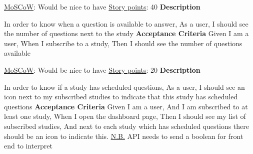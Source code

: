 \documentclass[12pt, a4paper]{report}
\begin{document}
\vspace*{20px}

\begin{tcolorbox}[width=\textwidth,colback={White},title={\textbf {Study questions notification}},colbacktitle=grey,coltitle=black]
\underline{MoSCoW}: Would be nice to have
\hfill
\underline {Story points}: 40
\newline
\newline
\blindtext \textbf{Description}
\newline

In order to know when a question is available to answer,\newline
As a user,\newline
I should see the number of questions next to the study\newline
\newline
 \textbf{Acceptance Criteria}
 \newline
Given I am a user,\newline
When I subscribe to a study,\newline
Then I should see the number of questions available\newline
\end{tcolorbox}  

\vspace*{20px}

\begin{tcolorbox}[width=\textwidth,colback={White},title={\textbf {Flag to indicate scheduled questions}},colbacktitle=grey,coltitle=black]
\underline{MoSCoW}: Would be nice to have
\hfill
\underline {Story points}: 20
\newline
\newline
\blindtext \textbf{Description}
\newline

In order to know if a study has scheduled questions,\newline
As a user,\newline
I should see an icon next to my subscribed studies to indicate that this study has scheduled questions
\newline
\newline
 \textbf{Acceptance Criteria}
 \newline
Given I am a user,\newline
And I am subscribed to at least one study,\newline
When I open the dashboard page,\newline
Then I should see my list of subscribed studies,\newline
And next to each study which has scheduled questions there should be an icon to indicate this.
\newline\newline
\underline{N.B.} API needs to send a boolean for front end to interpret
\end{tcolorbox}  
\end{document}
